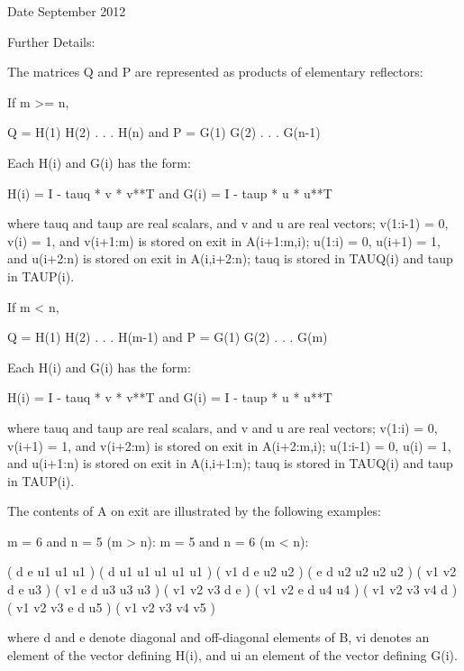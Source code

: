 \begin{DoxyDate}{Date}
September 2012 
\end{DoxyDate}
\begin{DoxyParagraph}{Further Details\+: }
\begin{DoxyVerb}  The matrices Q and P are represented as products of elementary
  reflectors:

  If m >= n,

     Q = H(1) H(2) . . . H(n)  and  P = G(1) G(2) . . . G(n-1)

  Each H(i) and G(i) has the form:

     H(i) = I - tauq * v * v**T  and G(i) = I - taup * u * u**T

  where tauq and taup are real scalars, and v and u are real vectors;
  v(1:i-1) = 0, v(i) = 1, and v(i+1:m) is stored on exit in A(i+1:m,i);
  u(1:i) = 0, u(i+1) = 1, and u(i+2:n) is stored on exit in A(i,i+2:n);
  tauq is stored in TAUQ(i) and taup in TAUP(i).

  If m < n,

     Q = H(1) H(2) . . . H(m-1)  and  P = G(1) G(2) . . . G(m)

  Each H(i) and G(i) has the form:

     H(i) = I - tauq * v * v**T  and G(i) = I - taup * u * u**T

  where tauq and taup are real scalars, and v and u are real vectors;
  v(1:i) = 0, v(i+1) = 1, and v(i+2:m) is stored on exit in A(i+2:m,i);
  u(1:i-1) = 0, u(i) = 1, and u(i+1:n) is stored on exit in A(i,i+1:n);
  tauq is stored in TAUQ(i) and taup in TAUP(i).

  The contents of A on exit are illustrated by the following examples:

  m = 6 and n = 5 (m > n):          m = 5 and n = 6 (m < n):

    (  d   e   u1  u1  u1 )           (  d   u1  u1  u1  u1  u1 )
    (  v1  d   e   u2  u2 )           (  e   d   u2  u2  u2  u2 )
    (  v1  v2  d   e   u3 )           (  v1  e   d   u3  u3  u3 )
    (  v1  v2  v3  d   e  )           (  v1  v2  e   d   u4  u4 )
    (  v1  v2  v3  v4  d  )           (  v1  v2  v3  e   d   u5 )
    (  v1  v2  v3  v4  v5 )

  where d and e denote diagonal and off-diagonal elements of B, vi
  denotes an element of the vector defining H(i), and ui an element of
  the vector defining G(i).\end{DoxyVerb}
 
\end{DoxyParagraph}
\hypertarget{group__realGEcomputational_gaa7ed93332ee7ff7ab268080a453615b6}{}
